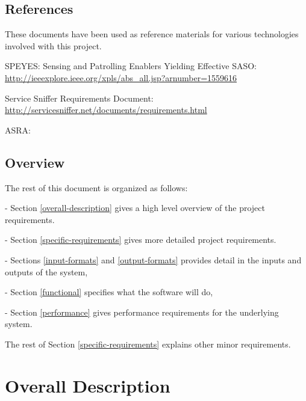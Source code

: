 \documentclass[titlepage]{article}
\begin{document}

\subsection{References%
  \label{references}%
}

These documents have been used as reference materials for various technologies involved with this project.
%
\begin{itemize*}
	\item SPEYES: Sensing and Patrolling Enablers Yielding Effective SASO: \url{http://ieeexplore.ieee.org/xpls/abs_all.jsp?arnumber=1559616}
	\item Service Sniffer Requirements Document: \url{http://servicesniffer.net/documents/requirements.html}
  \item ASRA: %
\end{itemize*}



\subsection{Overview%
  \label{overview}%
}

The rest of this document is organized as follows: 
\begin{itemize*}
	\item[-]Section \ref{overall-description} gives a high level overview of the project requirements.  
	\item[-]Section \ref{specific-requirements} gives more detailed project requirements.  
	\item[-]Sections \ref{input-formats} and \ref{output-formats} provides detail in the inputs and outputs of the system, 
	\item[-]Section \ref{functional} specifies what the software will do, 
	\item[-]Section \ref{performance} gives performance requirements for the underlying system.
\end{itemize*}
The rest of Section \ref{specific-requirements} explains other minor requirements.



\section{Overall Description%
  \label{overall-description}%
}
\end{document}
